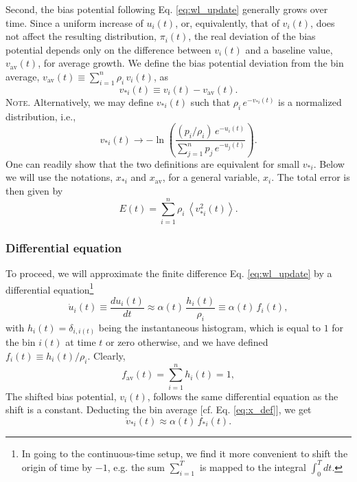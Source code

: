 \documentclass[preprint, superscriptaddress, floatfix]{revtex4-1}
\newcommand{\note}[1]{{\color{DarkGreen}\footnotesize \textsc{Note.} #1}}
\newcommand{\Err}{E}
\newcommand{\bav}[1]{#1_\mathrm{av}}
\begin{document}
Second, the bias potential following Eq. \eqref{eq:wl_update}
generally grows over time.
%
Since a uniform increase of $u_i(t)$, or, equivalently, that of $v_i(t)$,
does not affect the resulting distribution, $\pi_i(t)$,
the real deviation of the bias potential
depends only on the difference between $v_i(t)$
and a baseline value, $\bav{v}(t)$,
for average growth\cite{
dama2014}.
%
We define the bias potential deviation from the
bin average, $\bav{v}(t) \equiv \sum_{i=1}^n \rho_i \, v_i(t)$,
as
%
\begin{equation}
  v_{*i}(t) \equiv v_i(t) - \bav{v}(t)
  .
\label{eq:x_def}
\end{equation}
%
\note{Alternatively,
  we may define $v_{*i}(t)$ such that
  $\rho_i \, e^{-v_{*i}(t)}$ is a normalized distribution,
  i.e.,
  $$
  v_{*i}(t) \to -\ln\left(
    \frac{ (p_i/\rho_i) \, e^{ -u_i(t) } }
    { \sum_{j=1}^n p_j \, e^{ -u_j(t) } }
  \right).
  $$
  One can readily show that the two definitions are equivalent
  for small $v_{*i}$.}%
%
Below we will use the notations, $x_{*i}$ and $\bav{x}$,
for a general variable, $x_i$.
%
The total error is then given by
%
\begin{equation}
  \Err(t)
  =
  \sum_{i = 1}^n \rho_i \,
  \left\langle v_{*i}^2(t) \right\rangle
  .
\label{eq:error_def}
\end{equation}




\subsubsection{\label{sec:sbin_diffeq}
Differential equation}



To proceed, we will
approximate the finite difference Eq. \eqref{eq:wl_update}
by a differential equation\footnote{In
going to the continuous-time setup,
we find it more convenient to shift the origin of time by $-1$,
e.g. the sum $\sum_{i=1}^T$ is mapped to the integral $\int_0^T dt$.}
%
\begin{equation}
  \dot u_i(t)
  \equiv
  \frac{ d u_i(t) } { dt }
  \approx
  \alpha(t) \, \frac{ h_i(t) } { \rho_i }
  \equiv
  \alpha(t) \, f_i(t)
  ,
  \label{eq:ut_diffeq}
\end{equation}
%
with
%
$h_i(t) = \delta_{i, i(t)}$
%
being the instantaneous histogram,
which is equal to $1$
for the bin $i(t)$ at time $t$
or zero otherwise,
and we have defined
$f_i(t) \equiv h_i(t) /\rho_i$.
%
Clearly,
%
\begin{equation}
  \bav{f}(t) = \sum_{i=1}^n h_i(t) = 1
  ,
  \label{eq:fav1}
\end{equation}
%
The shifted bias potential, $v_i(t)$,
follows the same differential equation
as the shift is a constant.
%
Deducting the bin average [cf. Eq. \eqref{eq:x_def}],
we get
%
\begin{equation}
  \dot v_{*i}(t)
  \approx
  \alpha(t) \, f_{*i}(t)
  .
  \label{eq:vt_diffeq}
\end{equation}
\end{document}
